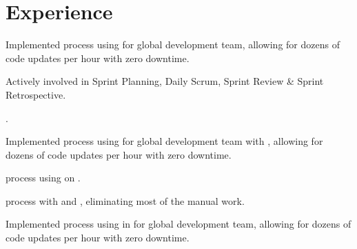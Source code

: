 \documentclass[]{resume}
\begin{document}
\begin{minipage}[t]{0.66\textwidth} 


\section{Experience}
\begin{tightemize}
\item Implemented  process using  for global development team, allowing for dozens of code updates per hour with zero downtime.
\item Actively involved in Sprint Planning, Daily Scrum, Sprint Review \& Sprint Retrospective.
\item {}.
\end{tightemize}
\sectionsep
{}
\begin{tightemize}
\item Implemented  process using  for global development team with , allowing for dozens of code updates per hour with zero downtime.
\item {} process using  on .
\item {} process with  and , eliminating most of the manual work.
\end{tightemize}
\sectionsep
{}
\begin{tightemize}
\item Implemented  process using  in  for global development team, allowing for dozens of code updates per hour with zero downtime.

\end{tightemize}
\end{minipage}
\end{document}
